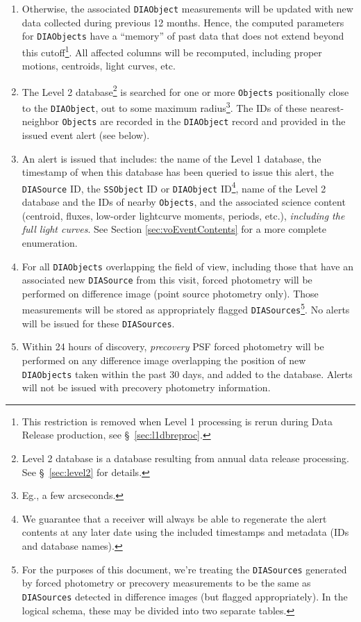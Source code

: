\documentclass[12pt]{article}
\newcommand{\code}[1]{\texttt{#1}}
\newcommand{\DIASource}{\code{DIASource}\xspace}
\newcommand{\DIASources}{\code{DIASources}\xspace}
\newcommand{\DIAObject}{\code{DIAObject}\xspace}
\newcommand{\DIAObjects}{\code{DIAObjects}\xspace}
\newcommand{\DB}{{Level 1 database}\xspace}
\newcommand{\DR}{{Level 2 database}\xspace}
\newcommand{\Objects}{\code{Objects}\xspace}
\newcommand{\SSObject}{\code{SSObject}\xspace}
\begin{document}
\begin{enumerate}
\item Otherwise, the associated \DIAObject measurements will be updated with new data
collected during previous 12 months. Hence, the computed parameters for \DIAObjects have a ``memory'' of past data that does not extend beyond this cutoff\footnote{This restriction is removed when Level 1 processing is
rerun during Data Release production, see \S~\ref{sec:l1dbreproc}.}. All affected columns will be recomputed, including proper motions, centroids, light curves, etc.
\item The \DR\footnote{\DR is a database resulting from annual data release processing. See \S~\ref{sec:level2} for details.} is searched for one or more \Objects positionally close to the \DIAObject, out to some maximum radius\footnote{Eg., a few arcseconds.}. The IDs of these nearest-neighbor \Objects are recorded in the \DIAObject record and provided in the issued
event alert (see below).
\item An alert is issued that includes: the name of the \DB, the timestamp of when this database has been queried to issue this alert, the \DIASource ID, the \SSObject ID or \DIAObject ID\footnote{We guarantee that a receiver will always be able to regenerate the alert contents at any later date using the included timestamps and metadata (IDs and database names).}, name of the \DR and the IDs of nearby \Objects, and the associated science content (centroid, fluxes, low-order lightcurve moments, periods, etc.), {\em including the full light curves}. See Section \ref{sec:voEventContents} for a more complete enumeration.
\item For all \DIAObjects overlapping the field of view, including those that have an associated
new \DIASource from this visit, forced photometry will be performed on difference image (point source photometry only). Those measurements will be stored as appropriately flagged \DIASources\footnote{For the purposes of this document, we're treating the \DIASources generated by forced photometry or precovery measurements to be the same as \DIASources detected in difference images (but flagged appropriately). In the logical schema, these may be divided into two separate tables.}.  No alerts will be issued for these \DIASources.
\item Within 24 hours of discovery, {\em precovery} PSF forced photometry will be performed on any difference image overlapping the position of new \DIAObjects taken within the past 30 days, and added to the database. Alerts will not be issued with precovery photometry information.
\end{enumerate}
\end{document}
